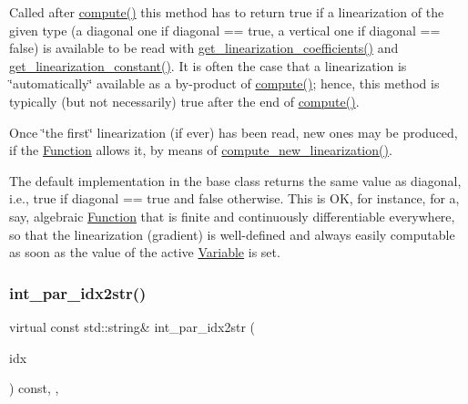 Called after \mbox{\hyperlink{class_s_m_spp__di__unipi__it_1_1_function_a504d4e3e174c7a518cc66156a8a45ce5}{compute()}} this method has to return true if a linearization of the given type (a diagonal one if diagonal == true, a vertical one if diagonal == false) is available to be read with \mbox{\hyperlink{class_s_m_spp__di__unipi__it_1_1_c05_function_a6fa70047dc8b3d43a3ed44f1859a7239}{get\+\_\+linearization\+\_\+coefficients()}} and \mbox{\hyperlink{class_s_m_spp__di__unipi__it_1_1_c05_function_a3dd9dea6fa3125e0c45acb5fc28955f8}{get\+\_\+linearization\+\_\+constant()}}. It is often the case that a linearization is \char`\"{}automatically\char`\"{} available as a by-\/product of \mbox{\hyperlink{class_s_m_spp__di__unipi__it_1_1_function_a504d4e3e174c7a518cc66156a8a45ce5}{compute()}}; hence, this method is typically (but not necessarily) true after the end of \mbox{\hyperlink{class_s_m_spp__di__unipi__it_1_1_function_a504d4e3e174c7a518cc66156a8a45ce5}{compute()}}.

Once \char`\"{}the first\char`\"{} linearization (if ever) has been read, new ones may be produced, if the \mbox{\hyperlink{class_s_m_spp__di__unipi__it_1_1_function}{Function}} allows it, by means of \mbox{\hyperlink{class_s_m_spp__di__unipi__it_1_1_c05_function_a9a77f2430dcf732f6d6d9fd50d923baf}{compute\+\_\+new\+\_\+linearization()}}.

The default implementation in the base class returns the same value as diagonal, i.\+e., true if diagonal == true and false otherwise. This is OK, for instance, for a, say, algebraic \mbox{\hyperlink{class_s_m_spp__di__unipi__it_1_1_function}{Function}} that is finite and continuously differentiable everywhere, so that the linearization (gradient) is well-\/defined and always easily computable as soon as the value of the active \mbox{\hyperlink{class_s_m_spp__di__unipi__it_1_1_variable}{Variable}} is set. \mbox{\label{class_s_m_spp__di__unipi__it_1_1_c05_function_a61e973f39747f63b8f56d97cc62e32ce}} 
\subsubsection{\texorpdfstring{int\+\_\+par\+\_\+idx2str()}{int\_par\_idx2str()}}
{\footnotesize\ttfamily virtual const std\+::string\& int\+\_\+par\+\_\+idx2str (\begin{DoxyParamCaption}\item[{const \mbox{\hyperlink{class_s_m_spp__di__unipi__it_1_1_thin_compute_interface_aa3d710629ad8c434286726ad810c3b47}{idx\+\_\+type}}}]{idx }\end{DoxyParamCaption}) const\hspace{0.3cm}{\ttfamily [inline]}, {\ttfamily [override]}, {\ttfamily [virtual]}}



